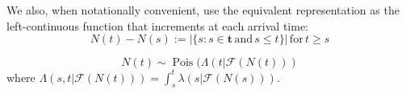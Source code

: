 \documentclass[11pt]{article}
\begin{document}
    We also, when notationally convenient, use the equivalent representation
as the left-continuous function that increments at each arrival time: \[
N(t)-N(s):= \left|\{s:s\in \mathbf{t}\,\mathrm{and}\,s\leq t\}\right| \,\mathrm{ for }\, t\geq s
\]

    \[N(t)\sim \operatorname{Pois}(\Lambda(t|\mathcal{F}(N(t)))\] where
\(\Lambda(s,t|\mathcal{F}(N(t)))=\int_s^t \lambda(s|\mathcal{F}(N(s))).\)


    
    




    
    
\end{document}
